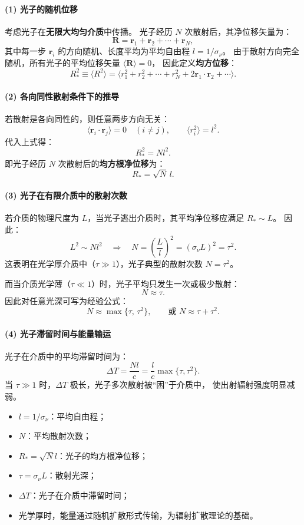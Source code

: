 \paragraph{(1) 光子的随机位移}
考虑光子在\textbf{无限大均匀介质}中传播。  
光子经历 $N$ 次散射后，其净位移矢量为：
\[
\mathbf{R} = \mathbf{r}_1 + \mathbf{r}_2 + \cdots + \mathbf{r}_N,
\]
其中每一步 $\mathbf{r}_i$ 的方向随机、长度平均为平均自由程 $l=1/\sigma_\nu$。  
由于散射方向完全随机，所有光子的平均位移矢量 $\langle \mathbf{R} \rangle = 0$，  
因此定义\textbf{均方位移}：
\[
R_*^2 \equiv \langle R^2 \rangle = 
\langle r_1^2 + r_2^2 + \cdots + r_N^2 + 2\mathbf{r}_1\!\cdot\!\mathbf{r}_2 + \cdots \rangle.
\]

\paragraph{(2) 各向同性散射条件下的推导}
若散射是各向同性的，则任意两步方向无关：
\[
\langle \mathbf{r}_i \!\cdot\! \mathbf{r}_j \rangle = 0 \quad (i\neq j),
\qquad
\langle r_i^2 \rangle = l^2.
\]
代入上式得：
\[
\boxed{R_*^2 = N l^2.}
\]
即光子经历 $N$ 次散射后的\textbf{均方根净位移}为：
\[
R_* = \sqrt{N}\, l.
\]

\paragraph{(3) 光子在有限介质中的散射次数}
若介质的物理尺度为 $L$，当光子逃出介质时，其平均净位移应满足 $R_* \sim L$。  
因此：
\[
L^2 \sim N l^2 \quad \Rightarrow \quad 
\boxed{N = \left(\frac{L}{l}\right)^2 = (\sigma_\nu L)^2 = \tau^2.}
\]
这表明在光学厚介质中（$\tau \gg 1$），光子典型的散射次数 $N = \tau^2$。

而当介质光学薄（$\tau \ll 1$）时，光子平均只发生一次或极少散射：
\[
N \approx \tau.
\]
因此对任意光深可写为经验公式：
\[
\boxed{N \approx \max\{\tau,\, \tau^2\}},
\qquad
\text{或 } N \approx \tau + \tau^2.
\]

\paragraph{(4) 光子滞留时间与能量输运}
光子在介质中的平均滞留时间为：
\[
\Delta T = \frac{N l}{c} = \frac{l}{c} \max\{\tau, \tau^2\}.
\]
当 $\tau \gg 1$ 时，$\Delta T$ 极长，光子多次散射被“困”于介质中，
使出射辐射强度明显减弱。

\begin{derivationnote}[物理含义]
\begin{itemize}
  \item $l=1/\sigma_\nu$：平均自由程；
  \item $N$：平均散射次数；
  \item $R_*=\sqrt{N}l$：光子的均方根净位移；
  \item $\tau = \sigma_\nu L$：散射光深；
  \item $\Delta T$：光子在介质中滞留时间；
  \item 光学厚时，能量通过随机扩散形式传输，为辐射扩散理论的基础。
\end{itemize}
\end{derivationnote}


